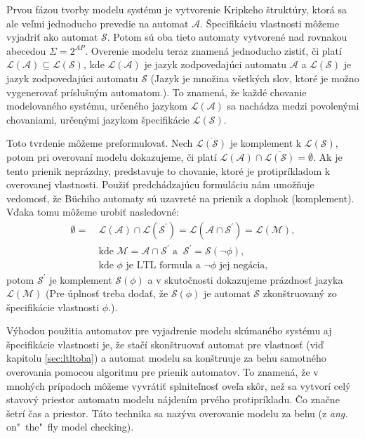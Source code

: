 \documentclass[11pt,final,oneside]{fithesis}
\begin{document}
Prvou f\'azou tvorby modelu syst\'emu je vytvorenie Kripkeho \v strukt\'ury, ktor\'a sa ale ve\v lmi jednoducho prevedie na automat $\mathcal{A}$. 
\v Specifik\'aciu vlastnosti m\^ o\v zeme vyjadri\v t ako automat $\mathcal{S}$. Potom s\'u oba tieto automaty vytvoren\'e nad rovnakou abecedou 
$\Sigma = 2^{AP}$. Overenie modelu teraz znamen\'a jednoducho zisti\v t, \v ci plat\'i $\mathcal{L(A)} \subseteq \mathcal{L(S)}$, kde $\mathcal{L(A)}$ je 
jazyk zodpovedaj\'uci automatu $\mathcal{A}$ a 
$\mathcal{L(S)}$ je jazyk zodpovedaj\'uci automatu $\mathcal{S}$ (Jazyk je mno\v zina v\v setk\'ych slov, ktor\'e je mo\v zno vygenerova\v t 
pr\'islu\v sn\'ym automatom.). To znamen\'a, \v ze ka\v zd\'e chovanie modelovan\'eho syst\'emu, ur\v cen\'eho jazykom $\mathcal{L(A)}$ sa nach\'adza medzi
povolen\'ymi chovaniami, ur\v cen\'ymi jazykom \v specifik\'acie $\mathcal{L(S)}$.

Toto tvrdenie m\^ o\v zeme preformulova\v t. Nech $\overline{\mathcal{L(S)}}$ je komplement k $\mathcal{L(S)}$, potom pri overovan\'i modelu dokazujeme, \v ci
plat\'i $\mathcal{L(A)} \cap \overline{\mathcal{L(S)}} = \emptyset$. Ak je tento prienik nepr\'azdny, predstavuje to chovanie, ktor\'e je protipr\'ikladom 
k overovanej vlastnosti. Pou\v zi\v t predch\'adzaj\'ucu formul\'aciu n\'am umo\v z\v nuje vedomos\v t, \v ze B\"uchiho automaty s\'u uzavret\'e na prienik
a doplnok (komplement). V\v daka tomu m\^ o\v zeme urobi\v t nasledovn\'e:
\begin{align*}
\emptyset =\ &\mathcal{L(A)} \cap \mathcal{L(S^{'})} = \mathcal{L(A \cap S^{'})} = \mathcal{L(M)},\\
&\textrm{kde } \mathcal{M} = \mathcal{A \cap S^{'}} \textrm{ a }\ \mathcal{S^{'}}= \mathcal{S(\neg\phi)},\\
&\textrm{kde } \mathcal{\phi} \textrm{ je LTL formula a } \mathcal{\neg\phi} \textrm{ jej neg\'acia},
\end{align*}
potom $\mathcal{S^{'}}$ je komplement $\mathcal{S(\phi)}$ a v skuto\v cnosti dokazujeme pr\'azdnos\v t jazyka $\mathcal{L(M)}$ 
(Pre \'uplnos\v t treba doda\v t, \v ze $\mathcal{S(\phi)}$ je automat $\mathcal{S}$ zkon\v struovan\'y zo \v specifik\'acie vlastnosti $\phi$.).

V\'yhodou pou\v zitia automatov pre vyjadrenie modelu sk\'uman\'eho syst\'emu aj  \v specifik\'acie vlastnosti je, \v ze sta\v c\'i skon\v struova\v t automat
pre vlastnos\v t (vi\v d kapitolu \ref{sec:ltltoba}) a automat modelu sa kon\v struuje za behu samotn\'eho overovania pomocou algoritmu pre prienik automatov. 
To znamen\'a, \v ze v mnoh\'ych pr\'ipadoch m\^ o\v zeme vyvr\'ati\v t splnite\v lnos\v t ove\v la sk\^ or, ne\v z sa vytvor\'i cel\'y stavov\'y priestor
automatu modelu n\'ajden\'im prv\'eho protipr\'ikladu. \v Co zna\v cne \v setr\'i \v cas a priestor. T\'ato technika sa naz\'yva overovanie modelu za behu (z \textit{ang.} on"~the"~fly model checking).
\cite{Clarke:MC:BA}
\end{document}
